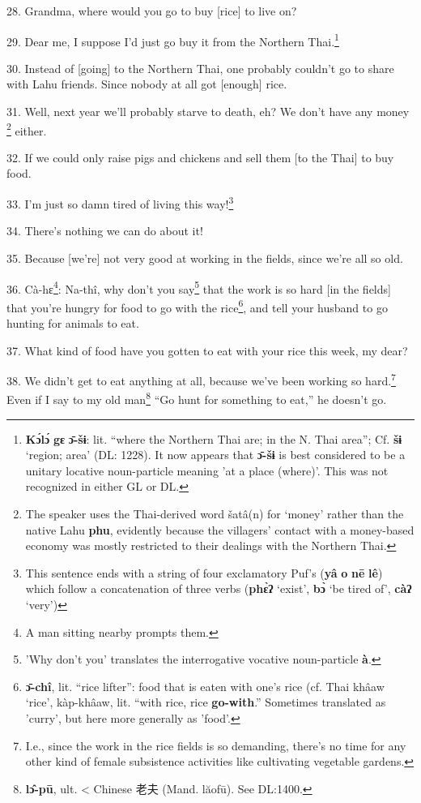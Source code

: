28. Grandma, where would you go to buy [rice] to live on?

29. Dear me, I suppose I'd just go buy it from the Northern Thai.\footnote{\textbf{Kɔ́lɔ́} \textbf{gɛ} \textbf{ɔ̄-šɨ}: lit. ``where the Northern Thai are; in the N. Thai area''; Cf. \textbf{šɨ} `region; area' (DL: 1228). It now appears that \textbf{ɔ̄-šɨ} is best considered to be a unitary locative noun-particle meaning 'at a place (where)'. This was not recognized in either GL or DL.}

30. Instead of [going] to the Northern Thai, one probably couldn't go to share
with Lahu friends. Since nobody at all got [enough] rice.

31. Well, next year we'll probably starve to death, eh? We don't have any money
\footnote{The speaker uses the Thai-derived word šatâ(n) for `money' rather than the native Lahu \textbf{phu}, evidently because the villagers' contact with a money-based economy was mostly restricted to their dealings with the Northern Thai.} either.

32. If we could only raise pigs and chickens and sell them [to the Thai] to buy
food.

33. I'm just so damn tired of living this way!\footnote{This sentence ends with a string of four exclamatory Puf's (\textbf{yâ} \textbf{o} \textbf{nē} \textbf{lê}) which follow a concatenation of three verbs (\textbf{phɛ̀ʔ} `exist', \textbf{bɔ̀} `be tired of', \textbf{càʔ} `very')}

34. There's nothing we can do about it!

35. Because [we're] not very good at working in the fields, since we're all so
old.


36. Cà-hɛ\footnote{A man sitting nearby prompts them.}: Na-thî, why don't you say\footnote{'Why don't you' translates the interrogative vocative noun-particle \textbf{à}.} that the work is so hard [in
the fields] that you're hungry for food to go with the rice\footnote{\textbf{ɔ̄-chî}, lit. ``rice lifter'': food that is eaten with one's rice (cf. Thai khâaw `rice', kàp-khâaw, lit. ``with rice, rice \textbf{go-with}.'' Sometimes translated as 'curry', but here more generally as 'food'.}, and tell your
husband to go hunting for animals to eat.

37. What kind of food have you gotten to eat with your rice this week, my dear?

38. We didn't get to eat anything at all, because we've been working so hard.\footnote{I.e., since the work in the rice fields is so demanding, there's no time for any other kind of female subsistence activities like cultivating vegetable gardens.}
Even if I say to my old man\footnote{\textbf{lɔ̂-pū}, ult. < Chinese 老夫 (Mand. lăofū). See DL:1400.} ``Go hunt for something to eat,'' he doesn't go.

